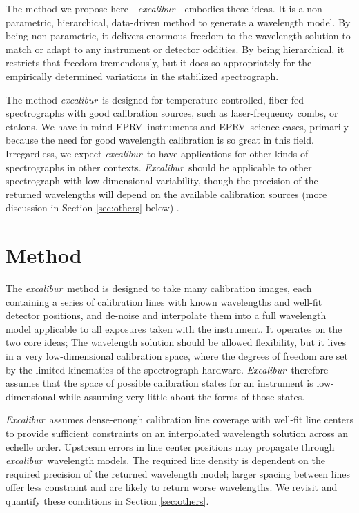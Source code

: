\documentclass[modern]{aastex63}
\newcommand{\project}[1]{\textsl{#1}}
\newcommand{\name}{\project{excalibur}}
\newcommand{\Name}{\project{Excalibur}}
\newcommand{\acronym}[1]{{\small{#1}}}
\newcommand{\eprv}{\acronym{EPRV}}
\begin{document}
The method we propose here---\name---embodies these ideas.
It is a non-parametric, hierarchical, data-driven method to generate a wavelength model.  By being non-parametric, it delivers enormous freedom to the wavelength solution to match or adapt to any instrument or detector oddities.  By being hierarchical, it restricts that freedom tremendously, but it does so appropriately for the empirically determined variations in the stabilized spectrograph.

The method \name\ is designed for temperature-controlled, fiber-fed spectrographs with good calibration sources, such as laser-frequency combs, or etalons.  We have in mind \eprv\ instruments and \eprv\ science cases, primarily because the need for good wavelength calibration is so great in this field.  Irregardless, we expect \name\ to have applications for other kinds of spectrographs in other contexts.  \Name\ should be applicable to other spectrograph with low-dimensional variability, though the precision of the returned wavelengths will depend on the available calibration sources (more discussion in Section \ref{sec:others} below) .


\section{Method} \label{sec:method}
The \name\ method is designed to take many calibration images, each containing a series of calibration lines with known wavelengths and well-fit detector positions, and de-noise and interpolate them into a full wavelength model applicable to all exposures taken with the instrument.  It operates on the two core ideas; The wavelength solution should be allowed flexibility, but it lives in a very low-dimensional calibration space, where the degrees of freedom are set by the limited kinematics of the spectrograph hardware.  \Name\ therefore assumes that the space of possible calibration states for an instrument is low-dimensional while assuming very little about the forms of those states.

\Name\ assumes dense-enough calibration line coverage with well-fit line centers to provide sufficient constraints on an interpolated wavelength solution across an echelle order.  Upstream errors in line center positions may propagate through \name\ wavelength models.  The required line density is dependent on the required precision of the returned wavelength model; larger spacing between lines offer less constraint and are likely to return worse wavelengths.  We revisit and quantify these conditions in Section \ref{sec:others}.
\end{document}
